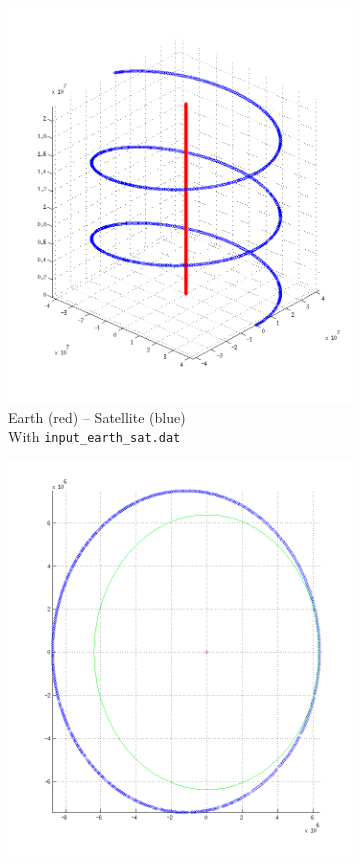 \documentclass{article}
\begin{document}
\begin{figure}[H]
\begin{subfigure}[b]{0.3\textwidth}
                \includegraphics[width=\textwidth]{img/earth_sat}
                \caption{Earth (red) -- Satellite (blue)\\With \texttt{input\_earth\_sat.dat}}
                \label{fig:satgeo}
        \end{subfigure}
        \begin{subfigure}[b]{0.3\textwidth}
                \centering
                \includegraphics[width=\textwidth]{img/nc}

\end{subfigure}
\end{figure}
\end{document}
